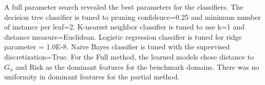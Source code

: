 \documentclass[letterpaper]{article}
\theoremstyle{plain}
\begin{document}
A full parameter search revealed the best parameters for the classifiers. The decision tree classifier is tuned to pruning confidence=0.25 and minimum number of instance per leaf=2. K-nearest neighbor classifier is tuned to use k=1 and distance measure=Euclidean. Logistic regression classifier is tuned for ridge parameter = 1.0E-8. Naive Bayes classifier is tuned with the supervised discretization=True. For the Full method, the learned models chose distance to $G_u$ and Risk as the dominant features for the benchmark domains. There was no uniformity in dominant features for the partial method.

% 
 
\end{document}
